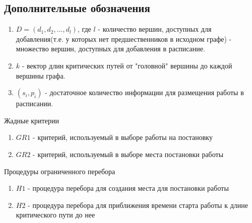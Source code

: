 \subsection{Дополнительные обозначения}
\begin{enumerate}
    \item $D= \left( d_1, d_2, \dots, d_l \right)$, где $l$ - количество вершин, доступных для добавления(т.е. у которых нет предшественников в исходном графе) - множество вершин, доступных для добавления в расписание.
    \item $k$ - вектор длин критических путей от "головной" вершины до каждой вершины графа.
    \item $\left( s_i, p_i \right)$ - достаточное количество информации для размещения работы в расписании.
\end{enumerate}
Жадные критерии
\begin{enumerate}
    \item $GR1$ - критерий, используемый в выборе работы на постановку
    \item $GR2$ - критерий, используемый в выборе места постановки работы
\end{enumerate}
Процедуры ограниченного перебора
\begin{enumerate}
    \item $H1$ - процедура перебора для создания места для постановки работы
    \item $H2$ - процедура перебора для приближения времени старта работы к длине критического пути до нее
\end{enumerate}

